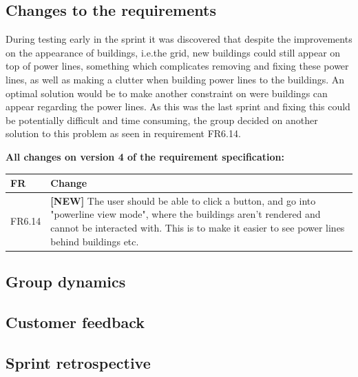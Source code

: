 \subsection{Changes to the requirements}

	During testing early in the sprint it was discovered that despite the improvements on the appearance of buildings, i.e.the grid, new buildings could still appear on top of power lines, something which complicates removing and fixing these power lines, as well as making a clutter when building power lines to the buildings. An optimal solution would be to make another constraint on were buildings can appear regarding the power lines. As this was the last sprint and fixing this could be potentially difficult and time consuming, the group decided on another solution to this problem as seen  in requirement FR6.14. 

	{\bf All changes on version 4 of the requirement specification:} \\
	\begin{tabular}{| p{1.5cm} | p{12cm} |}
		\hline
		\rowcolor{lightgray}
		{\bf FR} & {\bf Change} \\ \hline
		FR6.14 & {\bf \color{green}[NEW]} The user should be able to click a button, and go into "powerline view mode", where the buildings aren't rendered and cannot be interacted with. This is to make it easier to see power lines behind buildings etc. \\ \hline
	\end{tabular}

\subsection{Group dynamics}

\subsection{Customer feedback}

\subsection{Sprint retrospective}
